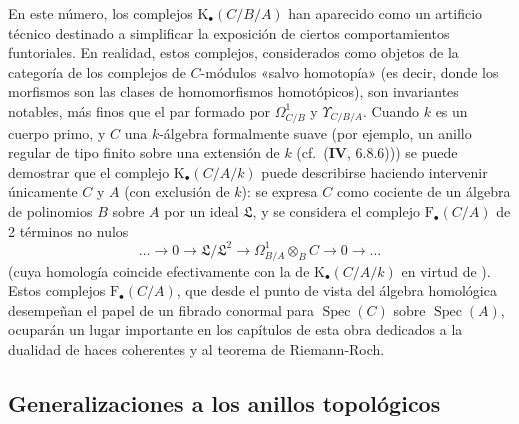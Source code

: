 \begin{remark}[20.6.26]
\label{0.20.6.26-fr}
En este número, los complejos $\mathrm{K}_\bullet(C/B/A)$ han aparecido como
un artificio técnico destinado a simplificar la exposición de ciertos
comportamientos funtoriales. En realidad, estos complejos, considerados como objetos
de la categoría de los
complejos de $C$-módulos «salvo homotopía» (es decir, donde los morfismos
son las clases de homomorfismos homotópicos), son invariantes notables,
más finos que el par formado por $\Omega^1_{C/B}$ y
$\Upsilon_{C/B/A}$. Cuando $k$ es un cuerpo primo, y $C$ una $k$-álgebra
formalmente suave (por ejemplo, un anillo regular de tipo finito sobre una
extensión de $k$ (cf.\ ($\mathbf{IV}$, 6.8.6))) se puede demostrar que el
complejo $\mathrm{K}_\bullet(C/A/k)$ puede describirse haciendo intervenir
únicamente $C$ y $A$ (con exclusión de $k$): se expresa $C$ como cociente
de un álgebra de polinomios $B$ sobre $A$ por un ideal $\mathfrak{L}$, y se
considera el complejo $\mathrm{F}_\bullet(C/A)$ de 2 términos no nulos
\[
  \ldots\to0\to\mathfrak{L}/\mathfrak{L}^2\to
  \Omega^1_{B/A}\otimes_B C\to0\to\ldots
\]
(cuya homología coincide efectivamente con la de
$\mathrm{K}_\bullet(C/A/k)$ en virtud de ). Estos
complejos $\mathrm{F}_\bullet(C/A)$, que desde el punto de vista del álgebra
homológica desempeñan el papel de un fibrado conormal para $\operatorname{Spec}(C)$
sobre $\operatorname{Spec}(A)$, ocuparán un lugar importante en
los capítulos de esta obra dedicados a la dualidad de haces coherentes y
al teorema de Riemann-Roch.
\end{remark}

\subsection{Generalizaciones a los anillos topológicos}
\label{subsection:0.20.7-fr}

